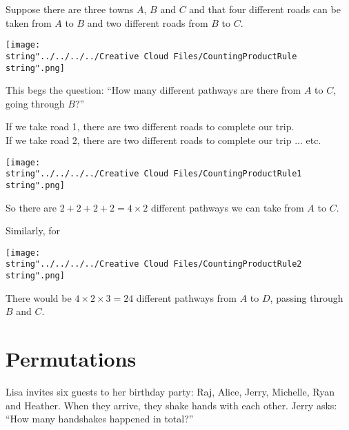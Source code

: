 \documentclass[11pt,a4paper]{book}
\begin{document}
Suppose there are three towns $A$, $B$ and $C$ and that four different
roads can be taken from $A$ to $B$ and two different roads from
$B$ to $C$.
\begin{center}
\texttt{[image: \\string"../../../../Creative Cloud Files/CountingProductRule\\string".png]}
\par\end{center}

This begs the question: ``How many different pathways are there from
$A$ to $C$, going through $B$?''

\begin{minipage}[t]{0.5\textwidth} 

If we take road 1, there are two different roads to complete our trip.\\

If we take road 2, there are two different roads to complete our trip
... etc.\\

\end{minipage}
\begin{minipage}[t]{0.2\textwidth} 
\begin{center}
\texttt{[image: \\string"../../../../Creative Cloud Files/CountingProductRule1\\string".png]}
\par\end{center}

\end{minipage}

So there are $2+2+2+2=4\times2$ different pathways we can take from
$A$ to $C$.

\newpage

Similarly, for 
\begin{center}
\texttt{[image: \\string"../../../../Creative Cloud Files/CountingProductRule2\\string".png]}
\par\end{center}

There would be $4\times2\times3=24$ different pathways from $A$
to $D$, passing through $B$ and $C$.

\section{Permutations }

Lisa invites six guests to her birthday party: Raj, Alice, Jerry,
Michelle, Ryan and Heather. When they arrive, they shake hands with
each other. Jerry asks: ``How many handshakes happened in total?''
\end{document}
